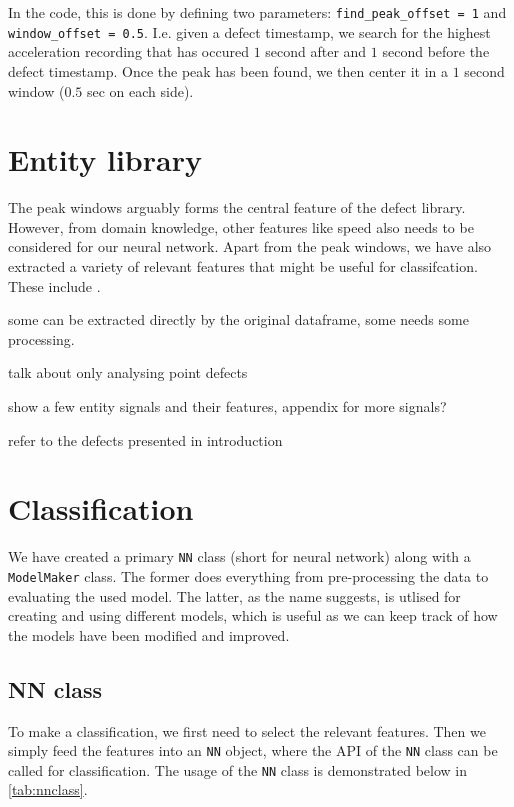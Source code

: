 In the code, this is done by defining two parameters: \verb|find_peak_offset = 1| and \verb|window_offset = 0.5|. I.e. given a defect timestamp, we search for the highest acceleration recording that has occured $1$ second after and $1$ second before the defect timestamp. Once the peak has been found, we then center it in a $1$ second window ($0.5$ sec on each side).


\section{Entity library}
The peak windows arguably forms the central feature of the defect library. However, from domain knowledge, other features like speed also needs to be considered for our neural network. Apart from the peak windows, we have also extracted a variety of relevant features that might be useful for classifcation. These include .

some can be extracted directly by the original dataframe, some needs some processing.

talk about only analysing point defects

show a few entity signals and their features, appendix for more signals? 

refer to the defects presented in introduction

\section{Classification}
We have created a primary \verb|NN| class (short for neural network) along with a \verb|ModelMaker| class. The former does everything from pre-processing the data to evaluating the used model. The latter, as the name suggests, is utlised for creating and using different models, which is useful as we can keep track of how the models have been modified and improved. 

\subsection{NN class}
To make a classification, we first need to select the relevant features. Then we simply feed the features into an \verb|NN| object, where the API of the \verb|NN| class can be called for classification. The usage of the \verb|NN| class is demonstrated below in \ref{tab:nnclass}.


